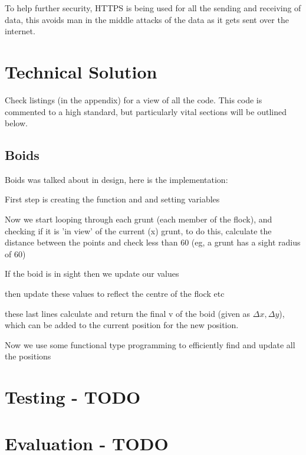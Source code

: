 \documentclass[a4paper, 11pt]{report}
\begin{document}
To help further security, HTTPS is being used for all the sending and receiving of data, this avoids man in the middle attacks of the data as it gets sent over the internet. 


\chapter{Technical Solution}
Check listings (in the appendix) for a view of all the code. This code is commented to a high standard, but particularly vital sections will be outlined below.

\section{Boids}
Boids was talked about in design, here is the implementation:

First step is creating the function and and setting variables


Now we start looping through each grunt (each member of the flock), and checking if it is 'in view' of the current (x) grunt, to do this, calculate the distance between the points and check less than 60 (eg, a grunt has a sight radius of 60) 


If the boid is in sight then we update our values


then update these values to reflect the centre of the flock etc


these last lines calculate and return the final v of the boid (given as $\Delta x, \Delta y$), which can be added to the current position for the new position.


Now we use some functional type programming to efficiently find and update all the positions




\chapter{Testing - TODO}
\chapter{Evaluation - TODO}
\end{document}
